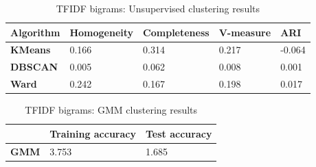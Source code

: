 \documentclass{article}
\begin{document}
\begin{table}[h]
\begin{tabular}{l|llll}
\textbf{Algorithm} & \textbf{Homogeneity} & \textbf{Completeness} & \textbf{V-measure} & \textbf{ARI} \\ \hline
\textbf{KMeans}    & 0.166                & 0.314                 & 0.217              & -0.064       \\
\textbf{DBSCAN}    & 0.005                & 0.062                 & 0.008              & 0.001        \\
\textbf{Ward}      & 0.242                & 0.167                 & 0.198              & 0.017       
\end{tabular}
\caption{TFIDF bigrams: Unsupervised clustering results}
\end{table}

\begin{table}[h]
\begin{tabular}{l|ll}
             & \textbf{Training accuracy} & \textbf{Test accuracy} \\ \hline
\textbf{GMM} & 3.753                      & 1.685                 
\end{tabular}
\caption{TFIDF bigrams: GMM clustering results}
\end{table}

\clearpage
\end{document}
